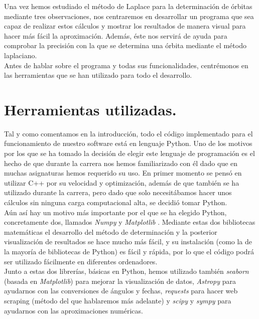 \label{chap:implementation}
Una vez hemos estudiado el método de Laplace para la determinación de órbitas mediante tres observaciones, nos centraremos en desarrollar un programa que sea capaz de realizar estos cálculos y mostrar los resultados de manera visual para hacer más fácil la aproximación. Además, éste nos servirá de ayuda para comprobar la precisión con la que se determina una órbita mediante el método laplaciano.\\

Antes de hablar sobre el programa y todas sus funcionalidades, centrémonos en las herramientas que se han utilizado para todo el desarrollo.\\

\section{Herramientas utilizadas.}
\label{sec:herramientas}
Tal y como comentamos en la introducción, todo el código implementado para el funcionamiento de nuestro software está en lenguaje Python. Uno de los motivos por los que se ha tomado la decisión de elegir este lenguaje de programación es el hecho de que durante la carrera nos hemos familiarizado con él dado que en muchas asignaturas hemos requerido su uso. En primer momento se pensó en utilizar C++ por su velocidad y optimización, además de que también se ha utilizado durante la carrera, pero dado que solo necesitábamos hacer unos cálculos sin ninguna carga computacional alta, se decidió tomar Python.\\

Aún así hay un motivo más importante por el que se ha elegido Python, concretamente dos, llamados \textit{Numpy} \cite{numpy} y \textit{Matplotlib} \cite{matplotlib}. Mediante estas dos bibliotecas matemáticas el desarrollo del método de determinación y la posterior visualización de resultados se hace mucho más fácil, y su instalación (como la de la mayoría de bibliotecas de Python) es fácil y rápida, por lo que el código podrá ser utilizado fácilmente en diferentes ordenadores.\\

Junto a estas dos librerías, básicas en Python, hemos utilizado también \textit{seaborn} \cite{seaborn} (basada en \textit{Matplotlib}) para mejorar la visualización de datos, \textit{Astropy} \cite{astropy} para ayudarnos con las conversiones de ángulos y fechas, \textit{requests} \cite{requests} para hacer web scraping (método del que hablaremos más adelante) y \textit{scipy} \cite{numpy} y \textit{sympy} \cite{sympy} para ayudarnos con las aproximaciones numéricas.\\

